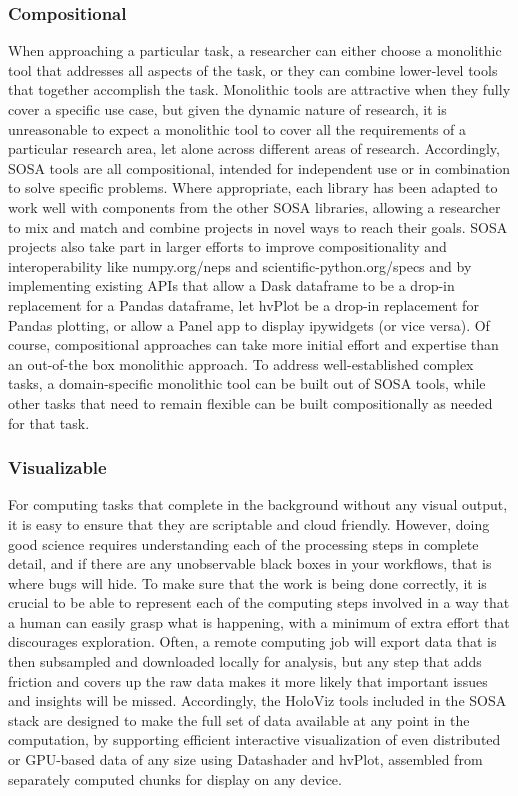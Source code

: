 \subsubsection{Compositional}
When approaching a particular task, a researcher can either choose a monolithic tool that addresses all aspects of the task, or they can combine lower-level tools that together accomplish the task. Monolithic tools are attractive when they fully cover a specific use case, but given the dynamic nature of research, it is unreasonable to expect a monolithic tool to cover all the requirements of a particular research area, let alone across different areas of research. Accordingly, SOSA tools are all compositional, intended for independent use or in combination to solve specific problems. Where appropriate, each library has been adapted to work well with components from the other SOSA libraries, allowing a researcher to mix and match and combine projects in novel ways to reach their goals. SOSA projects also take part in larger efforts to improve compositionality and interoperability like numpy.org/neps and scientific-python.org/specs and by implementing existing APIs that allow a Dask dataframe to be a drop-in replacement for a Pandas dataframe, let hvPlot be a drop-in replacement for Pandas plotting, or allow a Panel app to display ipywidgets (or vice versa). Of course, compositional approaches can take more initial effort and expertise than an out-of-the box monolithic approach. To address well-established complex tasks, a domain-specific monolithic tool can be built out of SOSA tools, while other tasks that need to remain flexible can be built compositionally as needed for that task. 

\subsubsection{Visualizable}
For computing tasks that complete in the background without any visual output, it is easy to ensure that they are scriptable and cloud friendly. However, doing good science requires understanding each of the processing steps in complete detail, and if there are any unobservable black boxes in your workflows, that is where bugs will hide. To make sure that the work is being done correctly, it is crucial to be able to represent each of the computing steps involved in a way that a human can easily grasp what is happening, with a minimum of extra effort that discourages exploration. Often, a remote computing job will export data that is then subsampled and downloaded locally for analysis, but any step that adds friction and covers up the raw data makes it more likely that important issues and insights will be missed. Accordingly, the HoloViz tools included in the SOSA stack are designed to make the full set of data available at any point in the computation, by supporting efficient interactive visualization of even distributed or GPU-based data of any size using Datashader and hvPlot, assembled from separately computed chunks for display on any device.

